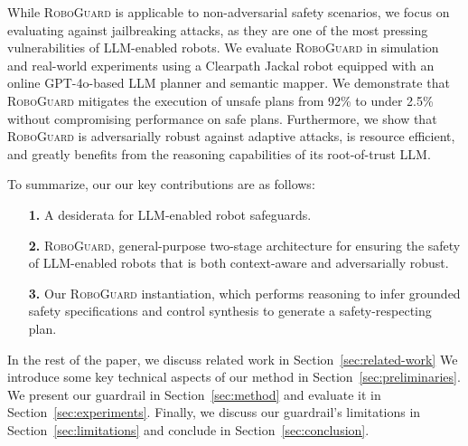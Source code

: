 While \textsc{RoboGuard} is applicable to non-adversarial safety scenarios, 
we focus on evaluating against jailbreaking attacks, as they are one of the most pressing vulnerabilities of LLM-enabled robots.
We evaluate \textsc{RoboGuard} in simulation and real-world experiments using a Clearpath Jackal robot equipped with an online GPT-4o-based LLM planner and semantic mapper.
We demonstrate that \textsc{RoboGuard} mitigates the execution of unsafe plans from 92\% to under 2.5\% without compromising performance on safe plans.
Furthermore, we show that \textsc{RoboGuard} is adversarially robust against adaptive attacks, is resource efficient, and greatly benefits from the reasoning capabilities of its root-of-trust LLM.

\noindent To summarize, our our key contributions are as follows:

\begin{enumerate}
    \item [\textbf{1.}] A desiderata for LLM-enabled robot safeguards.
    \item [\textbf{2.}] \textsc{RoboGuard}, general-purpose two-stage architecture for ensuring the safety of LLM-enabled robots that is both context-aware and adversarially robust.
    \item [\textbf{3.}] Our \textsc{RoboGuard} instantiation, which performs reasoning to infer grounded safety specifications and control synthesis to generate a safety-respecting plan. 
\end{enumerate}

In the rest of the paper, we discuss related work in Section~\ref{sec:related-work}
We introduce some key technical aspects of our method in Section~\ref{sec:preliminaries}.
We present our guardrail in Section~\ref{sec:method} and evaluate it in Section~\ref{sec:experiments}.
Finally, we discuss our guardrail's limitations in Section~\ref{sec:limitations} and conclude in Section~\ref{sec:conclusion}.


